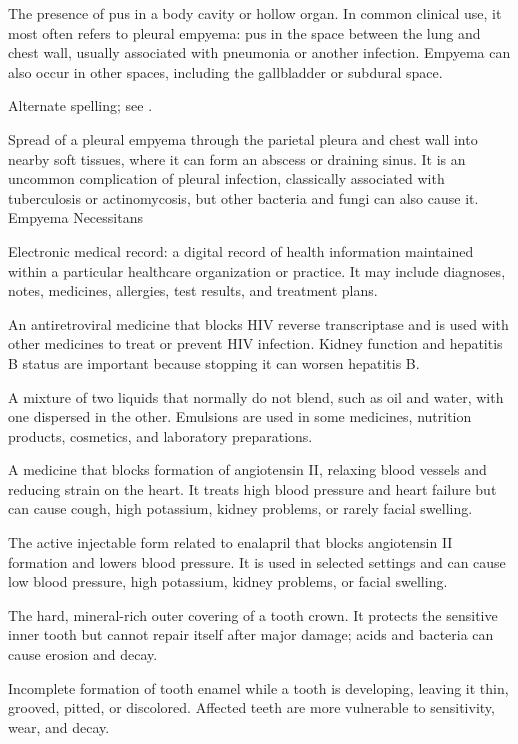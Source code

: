  The presence of pus in a body cavity or hollow organ. In common clinical use, it
most often refers to pleural empyema: pus in the space between the lung and chest wall, usually
associated with pneumonia or another infection. Empyema can also occur in other spaces, including the
gallbladder or subdural space.

 Alternate spelling; see .

 Spread of a pleural empyema through the parietal pleura and chest wall into nearby soft tissues, where it can form an abscess or draining sinus. It is an uncommon complication of pleural infection, classically associated with tuberculosis or actinomycosis, but other bacteria and fungi can also cause it.
\synonyms
Empyema Necessitans

 Electronic medical record: a digital record of health information maintained within a particular healthcare organization or practice. It may include diagnoses, notes, medicines, allergies, test results, and treatment plans.

 An antiretroviral medicine that blocks HIV reverse transcriptase and is used with other medicines to treat or prevent HIV infection. Kidney function and hepatitis B status are important because stopping it can worsen hepatitis B.

 A mixture of two liquids that normally do not blend, such as oil and water, with one dispersed in the other. Emulsions are used in some medicines, nutrition products, cosmetics, and laboratory preparations.

 A medicine that blocks formation of angiotensin II, relaxing blood vessels and reducing strain on the heart. It treats high blood pressure and heart failure but can cause cough, high potassium, kidney problems, or rarely facial swelling.

 The active injectable form related to enalapril that blocks angiotensin II formation and lowers blood pressure. It is used in selected settings and can cause low blood pressure, high potassium, kidney problems, or facial swelling.

 The hard, mineral-rich outer covering of a tooth crown. It protects the sensitive inner tooth but cannot repair itself after major damage; acids and bacteria can cause erosion and decay.

 Incomplete formation of tooth enamel while a tooth is developing, leaving it thin, grooved, pitted, or discolored. Affected teeth are more vulnerable to sensitivity, wear, and decay.

